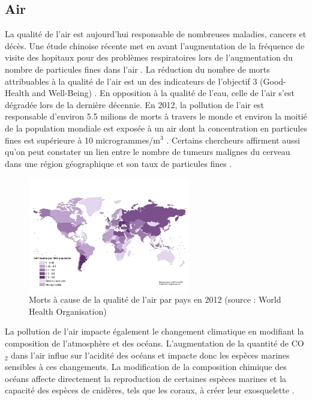 \documentclass[10pt, article]{llncs}
\begin{document}
		\subsection{Air}
			La qualité de l'air est aujourd'hui responsable de nombreuses maladies, cancers et décès. Une étude chinoise récente met en avant l'augmentation de la fréquence de visite des hopitaux pour des problèmes respiratoires lors de l'augmentation du nombre de particules fines dans l'air \cite{liu_effects_2016}. La réduction du nombre de morts attribuables à la qualité de l'air est un des indicateurs de l'objectif 3 (Good-Health and Well-Being) \cite{united_nations_goal_nodate-5}. En opposition à la qualité de l'eau, celle de l'air s'est dégradée lors de la dernière décennie. En 2012, la pollution de l'air est responsable d'environ 5.5 milions de morts à travers le monde et environ la moitié de la population mondiale est exposée à un air dont la concentration en particules fines est supérieure à 10 microgrammes/m$^{3}$ \cite{yale_university_epi_2016}. Certains chercheurs affirment aussi qu'on peut constater un lien entre le nombre de tumeurs malignes du cerveau dans une région géographique et son taux de particules fines \cite{andersen_long-term_nodate}. \\
			\begin{figure}
				\begin{center}
					\includegraphics[width=200pt]{img/pollution-deaths-by-1000-population.jpg}
				\end{center}
				\caption{Morts à cause de la qualité de l'air par pays en 2012 (source : World Health Organisation)}
			\end{figure}
			La pollution de l'air impacte également le changement climatique en modifiant la composition de l'atmosphère et des océans. L'augmentation de la quantité de CO$_{2}$ dans l'air influe sur l'acidité des océans et impacte donc les espèces marines sensibles à ces changements. La modification de la composition chimique des océans affecte directement la reproduction de certaines espèces marines et la capacité des espèces de cnidères, tels que les coraux, à créer leur exosquelette \cite{hoegh-guldberg_coral_2007}.  \\		
		
\end{document}
